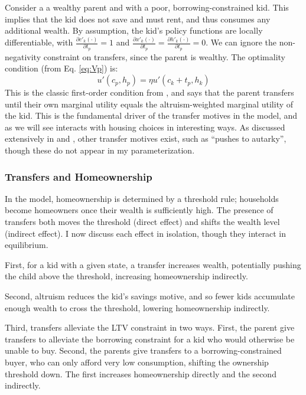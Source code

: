\documentclass[12pt]{article}
\begin{document}
Consider a a wealthy parent and with a poor, borrowing-constrained kid. This implies that the kid does not save and must rent, and thus consumes any additional wealth. By assumption, the kid's policy functions are locally differentiable, with $\frac{\partial c'_k(\cdot)}{\partial t_p}=1$ and $\frac{\partial x'_k(\cdot)}{\partial t_p}=\frac{\partial h'_k(\cdot)}{\partial t_p}=0$. We can ignore the non-negativity constraint on transfers, since the parent is wealthy. The optimality condition (from Eq. \ref{eq:Vp}) is:
\begin{equation}\label{eq:FOC}
	u'(c_p,h_p) = \eta u'(c_k + t_p,h_k)
\end{equation}
This is the classic first-order condition from \cite{Altonji1997a}, and says that the parent transfers until their own marginal utility equals the altruism-weighted marginal utility of the kid.  This is the fundamental driver of the transfer motives in the model, and as we  will see interacts with housing choices in interesting ways. As discussed extensively in \cite{Barczyk2020a} and \cite{Chu2020}, other transfer motives exist, such as ``pushes to autarky'', though these do not appear in my parameterization.

\subsubsection{Transfers and Homeownership}
In the model, homeownership is determined by a threshold rule; households become homeowners once their wealth is sufficiently high. The presence of transfers both moves the threshold (direct effect) and shifts the wealth level (indirect effect). I now discuss each effect in isolation, though they interact in equilibrium.

First, for a kid with a given state, a transfer increases  wealth, potentially pushing the child above the threshold, increasing homeownership indirectly.

Second, altruism reduces the kid's savings motive, and so fewer kids accumulate enough wealth to cross the threshold, lowering homeownership indirectly.

Third, transfers alleviate the LTV constraint in two ways. First, the parent give transfers to alleviate the borrowing constraint for a kid who would otherwise be unable to buy. Second, the parents give transfers to a borrowing-constrained buyer, who can only afford very low consumption, shifting the ownership threshold down. The first increases homeownership directly and the second indirectly.
\end{document}
